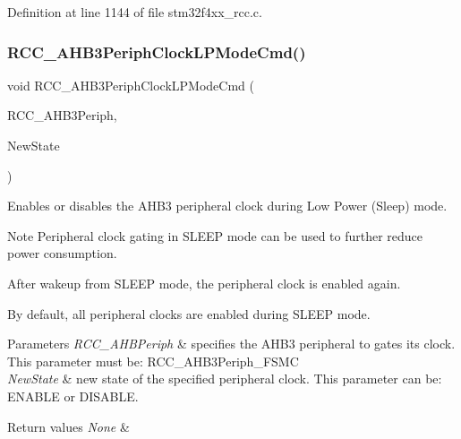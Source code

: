 Definition at line 1144 of file stm32f4xx\+\_\+rcc.\+c.

\mbox{\label{group___r_c_c_ga4e1df07cdfd81c068902d9d35fcc3911}} 
\subsubsection{\texorpdfstring{R\+C\+C\+\_\+\+A\+H\+B3\+Periph\+Clock\+L\+P\+Mode\+Cmd()}{RCC\_AHB3PeriphClockLPModeCmd()}}
{\footnotesize\ttfamily void R\+C\+C\+\_\+\+A\+H\+B3\+Periph\+Clock\+L\+P\+Mode\+Cmd (\begin{DoxyParamCaption}\item[{uint32\+\_\+t}]{R\+C\+C\+\_\+\+A\+H\+B3\+Periph,  }\item[{Functional\+State}]{New\+State }\end{DoxyParamCaption})}



Enables or disables the A\+H\+B3 peripheral clock during Low Power (Sleep) mode. 

\begin{DoxyNote}{Note}
Peripheral clock gating in S\+L\+E\+EP mode can be used to further reduce power consumption. 

After wakeup from S\+L\+E\+EP mode, the peripheral clock is enabled again. 

By default, all peripheral clocks are enabled during S\+L\+E\+EP mode. 
\end{DoxyNote}

\begin{DoxyParams}{Parameters}
{\em R\+C\+C\+\_\+\+A\+H\+B\+Periph} & specifies the A\+H\+B3 peripheral to gates its clock. This parameter must be\+: R\+C\+C\+\_\+\+A\+H\+B3\+Periph\+\_\+\+F\+S\+MC \\
\hline
{\em New\+State} & new state of the specified peripheral clock. This parameter can be\+: E\+N\+A\+B\+LE or D\+I\+S\+A\+B\+LE. \\
\hline
\end{DoxyParams}

\begin{DoxyRetVals}{Return values}
{\em None} & \\
\hline
\end{DoxyRetVals}


